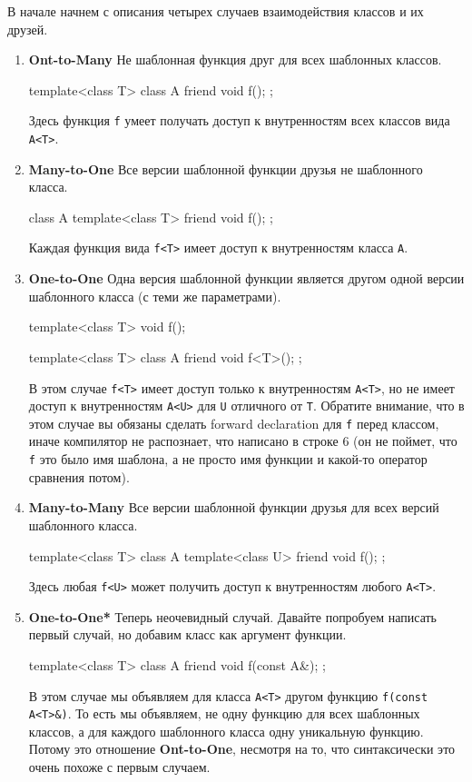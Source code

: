 В начале начнем с описания четырех случаев взаимодействия классов и их друзей.
\begin{enumerate}
\item \textbf{Ont-to-Many} Не шаблонная функция друг для всех шаблонных классов.
\begin{cppcode}
template<class T>
class A {
  friend void f();
};
\end{cppcode}
Здесь функция \verb"f" умеет получать доступ к внутренностям всех классов вида \verb"A<T>".

\item \textbf{Many-to-One} Все версии шаблонной функции друзья не шаблонного класса.
\begin{cppcode}
class A {
  template<class T>
  friend void f();
};
\end{cppcode}
Каждая функция вида \verb"f<T>" имеет доступ к внутренностям класса \verb"A".

\item \textbf{One-to-One} Одна версия шаблонной функции является другом одной версии шаблонного класса (с теми же параметрами).
\begin{cppcode}
template<class T>
void f();

template<class T>
class A {
  friend void f<T>();
};
\end{cppcode}
В этом случае \verb"f<T>" имеет доступ только к внутренностям \verb"A<T>", но не имеет доступ к внутренностям \verb"A<U>" для \verb"U" отличного от \verb"T".
Обратите внимание, что в этом случае вы обязаны сделать forward declaration для \verb"f" перед классом, иначе компилятор не распознает, что написано в строке 6 (он не поймет, что \verb"f" это было имя шаблона, а не просто имя функции и какой-то оператор сравнения потом).

\item \textbf{Many-to-Many} Все версии шаблонной функции друзья для всех версий шаблонного класса.
\begin{cppcode}
template<class T>
class A {
  template<class U>
  friend void f();
};
\end{cppcode}
Здесь любая \verb"f<U>" может получить доступ к внутренностям любого \verb"A<T>".

\item \textbf{One-to-One*} Теперь неочевидный случай.
Давайте попробуем написать первый случай, но добавим класс как аргумент функции.
\begin{cppcode}
template<class T>
class A {
  friend void f(const A&);
};
\end{cppcode}
В этом случае мы объявляем для класса \verb"A<T>" другом функцию \verb"f(const A<T>&)".
То есть мы объявляем, не одну функцию для всех шаблонных классов, а для каждого шаблонного класса одну уникальную функцию.
Потому это отношение \textbf{Ont-to-One}, несмотря на то, что синтаксически это очень похоже с первым случаем.
\end{enumerate}

